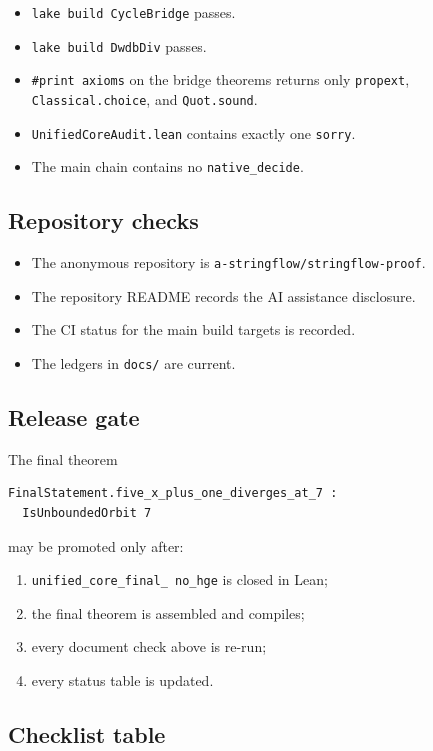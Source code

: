 \begin{itemize}[leftmargin=*]
\item \texttt{lake build CycleBridge} passes.
\item \texttt{lake build DwdbDiv} passes.
\item \texttt{\#print axioms} on the bridge theorems returns only
  \texttt{propext}, \texttt{Classical.choice}, and
  \texttt{Quot.sound}.
\item \texttt{UnifiedCoreAudit.lean} contains exactly one
  \texttt{sorry}.
\item The main chain contains no \texttt{native\_decide}.
\end{itemize}

\subsection{Repository checks}

\begin{itemize}[leftmargin=*]
\item The anonymous repository is
  \texttt{a-stringflow/stringflow-proof}.
\item The repository README records the AI assistance disclosure.
\item The CI status for the main build targets is recorded.
\item The ledgers in \texttt{docs/} are current.
\end{itemize}

\subsection{Release gate}

The final theorem
\begin{verbatim}
FinalStatement.five_x_plus_one_diverges_at_7 :
  IsUnboundedOrbit 7
\end{verbatim}
may be promoted only after:
\begin{enumerate}[leftmargin=*]
\item \texttt{unified\_\allowbreak core\_\allowbreak final\_\allowbreak
  no\_\allowbreak hge} is closed in Lean;
\item the final theorem is assembled and compiles;
\item every document check above is re-run;
\item every status table is updated.
\end{enumerate}

\subsection{Checklist table}

